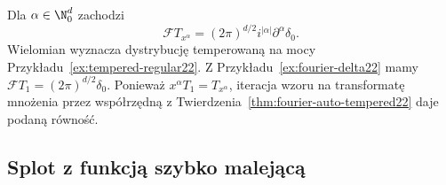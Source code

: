 \begin{przyklad}
\label{ex:dt-tempered-polynomial}
Dla $\alpha\in\N_0^d$ zachodzi
\[
 \mathcal F T_{x^\alpha}
 =(2\pi)^{d/2}i^{|\alpha|}\partial^\alpha\delta_0.
\]
Wielomian wyznacza dystrybucję temperowaną na mocy
Przykładu~\ref{ex:tempered-regular22}.
Z Przykładu~\ref{ex:fourier-delta22} mamy
$\mathcal FT_1=(2\pi)^{d/2}\delta_0$.
Ponieważ $x^\alpha T_1=T_{x^\alpha}$, iteracja
wzoru na transformatę mnożenia przez współrzędną
z Twierdzenia~\ref{thm:fourier-auto-tempered22}
daje podaną równość.
\end{przyklad}

\subsection{Splot z funkcją szybko malejącą}

